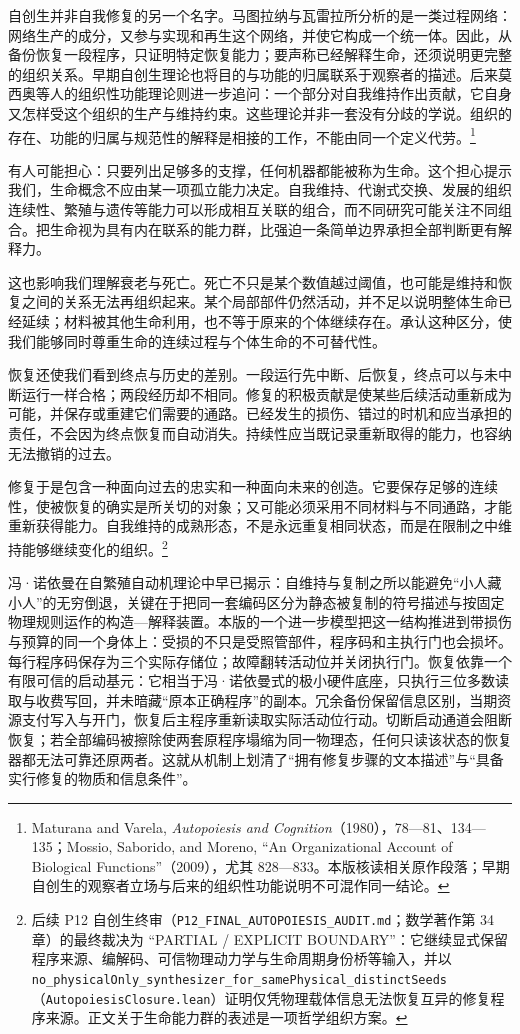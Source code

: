 \documentclass[
  11pt,
  oneside]{book}
\begin{document}
自创生并非自我修复的另一个名字。马图拉纳与瓦雷拉所分析的是一类过程网络：网络生产的成分，又参与实现和再生这个网络，并使它构成一个统一体。因此，从备份恢复一段程序，只证明特定恢复能力；要声称已经解释生命，还须说明更完整的组织关系。早期自创生理论也将目的与功能的归属联系于观察者的描述。后来莫西奥等人的组织性功能理论则进一步追问：一个部分对自我维持作出贡献，它自身又怎样受这个组织的生产与维持约束。这些理论并非一套没有分歧的学说。组织的存在、功能的归属与规范性的解释是相接的工作，不能由同一个定义代劳。\footnote{\hypertarget{ph-note-17}{}Maturana and Varela, \emph{Autopoiesis and Cognition}（1980），78---81、134---135；Mossio, Saborido, and Moreno, ``An Organizational Account of Biological Functions''（2009），尤其 828---833。本版核读相关原作段落；早期自创生的观察者立场与后来的组织性功能说明不可混作同一结论。}

有人可能担心：只要列出足够多的支撑，任何机器都能被称为生命。这个担心提示我们，生命概念不应由某一项孤立能力决定。自我维持、代谢式交换、发展的组织连续性、繁殖与遗传等能力可以形成相互关联的组合，而不同研究可能关注不同组合。把生命视为具有内在联系的能力群，比强迫一条简单边界承担全部判断更有解释力。

这也影响我们理解衰老与死亡。死亡不只是某个数值越过阈值，也可能是维持和恢复之间的关系无法再组织起来。某个局部部件仍然活动，并不足以说明整体生命已经延续；材料被其他生命利用，也不等于原来的个体继续存在。承认这种区分，使我们能够同时尊重生命的连续过程与个体生命的不可替代性。

恢复还使我们看到终点与历史的差别。一段运行先中断、后恢复，终点可以与未中断运行一样合格；两段经历却不相同。修复的积极贡献是使某些后续活动重新成为可能，并保存或重建它们需要的通路。已经发生的损伤、错过的时机和应当承担的责任，不会因为终点恢复而自动消失。持续性应当既记录重新取得的能力，也容纳无法撤销的过去。

修复于是包含一种面向过去的忠实和一种面向未来的创造。它要保存足够的连续性，使被恢复的确实是所关切的对象；又可能必须采用不同材料与不同通路，才能重新获得能力。自我维持的成熟形态，不是永远重复相同状态，而是在限制之中维持能够继续变化的组织。\footnote{\hypertarget{ph-note-18}{}后续 P12 自创生终审（\nolinkurl{P12_FINAL_AUTOPOIESIS_AUDIT.md}；数学著作第 34 章）的最终裁决为 ``PARTIAL / EXPLICIT BOUNDARY''：它继续显式保留程序来源、编解码、可信物理动力学与生命周期身份桥等输入，并以 \nolinkurl{no_physicalOnly_synthesizer_for_samePhysical_distinctSeeds}（\texttt{AutopoiesisClosure.lean}）证明仅凭物理载体信息无法恢复互异的修复程序来源。正文关于生命能力群的表述是一项哲学组织方案。}

冯·诺依曼在自繁殖自动机理论中早已揭示：自维持与复制之所以能避免``小人藏小人''的无穷倒退，关键在于把同一套编码区分为静态被复制的符号描述与按固定物理规则运作的构造---解释装置。本版的一个进一步模型把这一结构推进到带损伤与预算的同一个身体上：受损的不只是受照管部件，程序码和主执行门也会损坏。每行程序码保存为三个实际存储位；故障翻转活动位并关闭执行门。恢复依靠一个有限可信的启动基元：它相当于冯·诺依曼式的极小硬件底座，只执行三位多数读取与收费写回，并未暗藏``原本正确程序''的副本。冗余备份保留信息区别，当期资源支付写入与开门，恢复后主程序重新读取实际活动位行动。切断启动通道会阻断恢复；若全部编码被擦除使两套原程序塌缩为同一物理态，任何只读该状态的恢复器都无法可靠还原两者。这就从机制上划清了``拥有修复步骤的文本描述''与``具备实行修复的物质和信息条件''。
\end{document}
